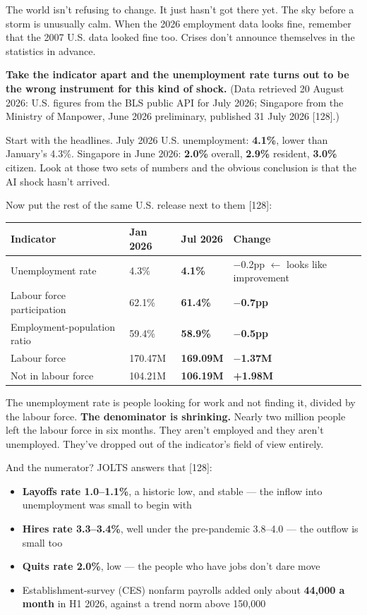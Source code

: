 \documentclass[11pt,a4paper]{article}
\begin{document}
The world isn't refusing to change. It just hasn't got there yet. The sky before a storm is unusually calm. When the 2026 employment data looks fine, remember that the 2007 U.S. data looked fine too. Crises don't announce themselves in the statistics in advance.

\textbf{Take the indicator apart and the unemployment rate turns out to be the wrong instrument for this kind of shock.} (Data retrieved 20 August 2026: U.S. figures from the BLS public API for July 2026; Singapore from the Ministry of Manpower, June 2026 preliminary, published 31 July 2026 [128].)

Start with the headlines. July 2026 U.S. unemployment: \textbf{4.1\%}, lower than January's 4.3\%. Singapore in June 2026: \textbf{2.0\%} overall, \textbf{2.9\%} resident, \textbf{3.0\%} citizen. Look at those two sets of numbers and the obvious conclusion is that the AI shock hasn't arrived.

Now put the rest of the same U.S. release next to them [128]:

\begin{center}

\begin{tabularx}{\textwidth}{lXXX}
\toprule
Indicator & Jan 2026 & Jul 2026 & Change \\
\midrule
Unemployment rate & 4.3\% & \textbf{4.1\%} & $-$0.2pp $\leftarrow$ looks like improvement \\
Labour force participation & 62.1\% & \textbf{61.4\%} & \textbf{$-$0.7pp} \\
Employment-population ratio & 59.4\% & \textbf{58.9\%} & \textbf{$-$0.5pp} \\
Labour force & 170.47M & \textbf{169.09M} & \textbf{$-$1.37M} \\
Not in labour force & 104.21M & \textbf{106.19M} & \textbf{+1.98M} \\
\bottomrule
\end{tabularx}
\end{center}

The unemployment rate is people looking for work and not finding it, divided by the labour force. \textbf{The denominator is shrinking.} Nearly two million people left the labour force in six months. They aren't employed and they aren't unemployed. They've dropped out of the indicator's field of view entirely.

And the numerator? JOLTS answers that [128]:

\begin{itemize}
  \item \textbf{Layoffs rate 1.0--1.1\%}, a historic low, and stable --- the inflow into unemployment was small to begin with
  \item \textbf{Hires rate 3.3--3.4\%}, well under the pre-pandemic 3.8--4.0 --- the outflow is small too
  \item \textbf{Quits rate 2.0\%}, low --- the people who have jobs don't dare move
  \item Establishment-survey (CES) nonfarm payrolls added only about \textbf{44,000 a month} in H1 2026, against a trend norm above 150,000
\end{itemize}
\end{document}
